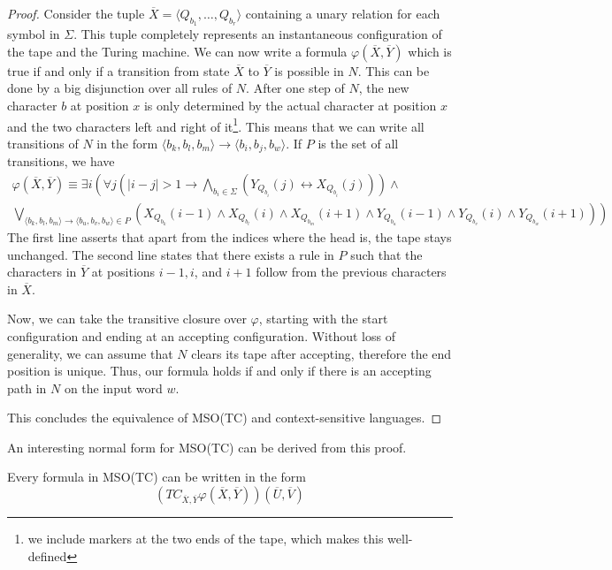 \begin{proof}
    Consider the tuple $\overline{X} = \langle Q_{b_1}, \dots, Q_{b_r} \rangle$ containing a unary relation for each symbol in $\Sigma$.
    This tuple completely represents an instantaneous configuration of the tape and the Turing machine.
    We can now write a formula $\varphi(\overline{X}, \overline{Y})$ which is true if and only if a transition from state $\overline{X}$ to $\overline{Y}$ is possible in $N$.
    This can be done by a big disjunction over all rules of $N$.
    After one step of $N$, the new character $b$ at position $x$ is only determined by the actual character at position $x$ and the two characters left and right of it\footnote{we include markers at the two ends of the tape, which makes this well-defined}.
    This means that we can write all transitions of $N$ in the form $\langle b_{k},b_{l},b_{m}\rangle \to \langle b_{i}, b_{j}, b_{w} \rangle$.
    If $P$ is the set of all transitions, we have
    \begin{multline*}
        \varphi(\overline{X}, \overline{Y}) \equiv \exists i \left(\forall j \left(|i - j| > 1 \to \bigwedge_{b_i \in \Sigma}\left(Y_{Q_{b_i}}(j) \leftrightarrow X_{Q_{b_i}}(j)\right)\right) \land \right. \\
        \left. \bigvee_{\langle b_{k},b_{l},b_{m}\rangle \to \langle b_{u}, b_{v}, b_{w} \rangle \in P} \left(X_{Q_{b_{k}}}(i - 1) \land X_{Q_{b_{l}}}(i) \land X_{Q_{b_{m}}}(i + 1) \land Y_{Q_{b_{u}}}(i - 1) \land Y_{Q_{b_{v}}}(i) \land Y_{Q_{b_{w}}}(i + 1) \right)\right)
    \end{multline*}
    The first line asserts that apart from the indices where the head is, the tape stays unchanged.
    The second line states that there exists a rule in $P$ such that the characters in $\overline{Y}$ at positions $i - 1, i$, and $i + 1$ follow from the previous characters in $\overline{X}$.

    Now, we can take the transitive closure over $\varphi$, starting with the start configuration and ending at an accepting configuration.
    Without loss of generality, we can assume that $N$ clears its tape after accepting, therefore the end position is unique.
    Thus, our formula holds if and only if there is an accepting path in $N$ on the input word $w$.

    This concludes the equivalence of \acs{MSO}(\acs{TC}) and context-sensitive languages.
\end{proof}

An interesting normal form for \acs{MSO}(\acs{TC}) can be derived from this proof.
\begin{corollary}
    \label{cor:normalmso}
    Every formula in \acs{MSO}(\acs{TC}) can be written in the form
    \[
        \left( TC_{\overline{X}, \overline{Y}} \varphi(\overline{X}, \overline{Y}) \right)\left( \overline{U}, \overline{V} \right)
    \]
\end{corollary}

